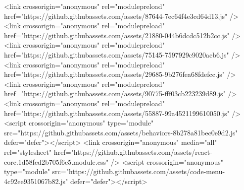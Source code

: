 <link crossorigin="anonymous" rel="modulepreload" href="https://github.githubassets.com/assets/87644-7ec64f4e3cd64d13.js" />
<link crossorigin="anonymous" rel="modulepreload" href="https://github.githubassets.com/assets/21880-044b6dcdc512b2cc.js" />
<link crossorigin="anonymous" rel="modulepreload" href="https://github.githubassets.com/assets/75145-7597929c9020acb6.js" />
<link crossorigin="anonymous" rel="modulepreload" href="https://github.githubassets.com/assets/29685-9b276fea68fdefcc.js" />
<link crossorigin="anonymous" rel="modulepreload" href="https://github.githubassets.com/assets/90775-fff03cb223239d89.js" />
<link crossorigin="anonymous" rel="modulepreload" href="https://github.githubassets.com/assets/55887-99a4521199610050.js" />
<script crossorigin="anonymous" type="module" src="https://github.githubassets.com/assets/behaviors-8b278a81bec0e9d2.js" defer="defer"></script>
<link crossorigin="anonymous" media="all" rel="stylesheet" href="https://github.githubassets.com/assets/react-core.1d58fed2b705f6e5.module.css" />
<script crossorigin="anonymous" type="module" src="https://github.githubassets.com/assets/code-menu-4c92ee9351067b82.js" defer="defer"></script>
  
